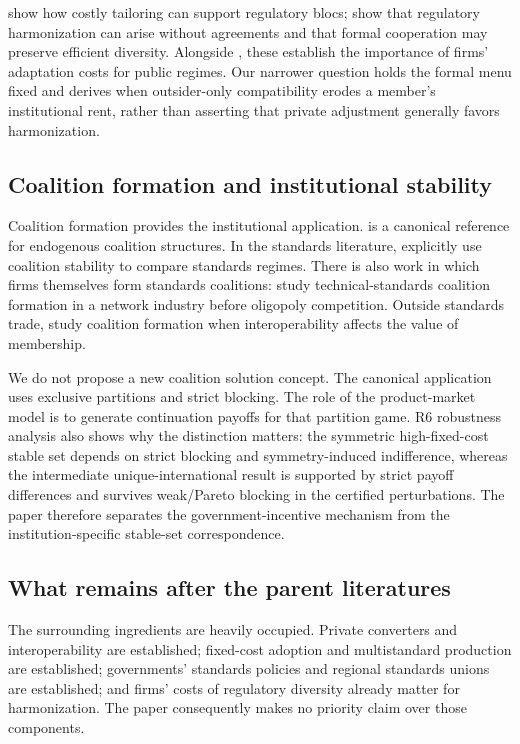 \citet{parentiVannoorenberghe2025} show how costly tailoring can support regulatory blocs; \citet{maggiMrazova2024} show that regulatory harmonization can arise without agreements and that formal cooperation may preserve efficient diversity. Alongside \citet{schmidtSteingress2022}, these establish the importance of firms' adaptation costs for public regimes. Our narrower question holds the formal menu fixed and derives when outsider-only compatibility erodes a member's institutional rent, rather than asserting that private adjustment generally favors harmonization.

\subsection{Coalition formation and institutional stability}
\label{subsec:lit-coalitions}

Coalition formation provides the institutional application. \citet{hartKurz1983} is a canonical reference for endogenous coalition structures. In the standards literature, \citet{takaradaEtAl2020} explicitly use coalition stability to compare standards regimes. There is also work in which firms themselves form standards coalitions: \citet{economidesSkrzypacz2003} study technical-standards coalition formation in a network industry before oligopoly competition. Outside standards trade, \citet{guoLiuNault2024} study coalition formation when interoperability affects the value of membership.

We do not propose a new coalition solution concept. The canonical application uses exclusive partitions and strict blocking. The role of the product-market model is to generate continuation payoffs for that partition game. R6 robustness analysis also shows why the distinction matters: the symmetric high-fixed-cost stable set depends on strict blocking and symmetry-induced indifference, whereas the intermediate unique-international result is supported by strict payoff differences and survives weak/Pareto blocking in the certified perturbations. The paper therefore separates the government-incentive mechanism from the institution-specific stable-set correspondence.

\subsection{What remains after the parent literatures}
\label{subsec:lit-positioning}

The surrounding ingredients are heavily occupied. Private converters and interoperability are established; fixed-cost adoption and multistandard production are established; governments' standards policies and regional standards unions are established; and firms' costs of regulatory diversity already matter for harmonization. The paper consequently makes no priority claim over those components.

